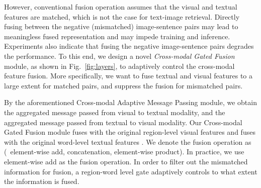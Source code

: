\documentclass[10pt,twocolumn,letterpaper]{article}
\begin{document}
However, conventional fusion operation assumes that the visual and textual features are matched, which is not the case for text-image retrieval. Directly fusing between the negative (mismatched) image-sentence pairs may lead to meaningless fused representation and may impede training and inference. 
Experiments also indicate that fusing the negative image-sentence pairs degrades the performance.
To this end, we design a novel \textit{Cross-modal Gated Fusion} module, as shown in Fig.~\ref{fig:layers}, to adaptively control the cross-modal feature fusion. 
More specifically, we want to fuse textual and visual features to a large extent for matched pairs, and suppress the fusion for mismatched pairs.



By the aforementioned Cross-modal Adaptive Message Passing module, we obtain the aggregated message  passed from visual to textual modality, and the aggregated message  passed from textual to visual modality. 
Our Cross-modal Gated Fusion module fuses  with the original region-level visual features  and fuses  with the original word-level textual features . 
We denote the fusion operation as  (\eg~element-wise add, concatenation, element-wise product). 
In practice, we use element-wise add as the fusion operation.
In order to filter out the mismatched information for fusion, a region-word level gate adaptively controls to what extent the information is fused. 
\end{document}
